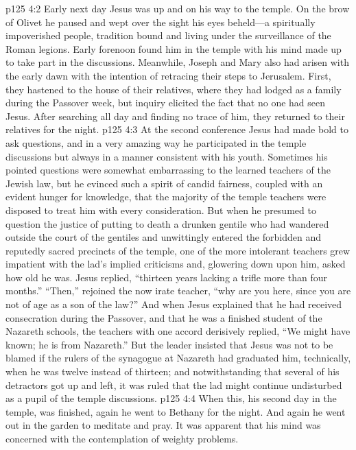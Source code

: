 \vs p125 4:2 Early next day Jesus was up and on his way to the temple. On the brow of Olivet he paused and wept over the sight his eyes beheld---a spiritually impoverished people, tradition bound and living under the surveillance of the Roman legions. Early forenoon found him in the temple with his mind made up to take part in the discussions. Meanwhile, Joseph and Mary also had arisen with the early dawn with the intention of retracing their steps to Jerusalem. First, they hastened to the house of their relatives, where they had lodged as a family during the Passover week, but inquiry elicited the fact that no one had seen Jesus. After searching all day and finding no trace of him, they returned to their relatives for the night.
\vs p125 4:3 At the second conference Jesus had made bold to ask questions, and in a very amazing way he participated in the temple discussions but always in a manner consistent with his youth. Sometimes his pointed questions were somewhat embarrassing to the learned teachers of the Jewish law, but he evinced such a spirit of candid fairness, coupled with an evident hunger for knowledge, that the majority of the temple teachers were disposed to treat him with every consideration. But when he presumed to question the justice of putting to death a drunken gentile who had wandered outside the court of the gentiles and unwittingly entered the forbidden and reputedly sacred precincts of the temple, one of the more intolerant teachers grew impatient with the lad’s implied criticisms and, glowering down upon him, asked how old he was. Jesus replied, \textcolor{ubdarkred}{“thirteen years lacking a trifle more than four months.”} “Then,” rejoined the now irate teacher, “why are you here, since you are not of age as a son of the law?” And when Jesus explained that he had received consecration during the Passover, and that he was a finished student of the Nazareth schools, the teachers with one accord derisively replied, “We might have known; he is from Nazareth.” But the leader insisted that Jesus was not to be blamed if the rulers of the synagogue at Nazareth had graduated him, technically, when he was twelve instead of thirteen; and notwithstanding that several of his detractors got up and left, it was ruled that the lad might continue undisturbed as a pupil of the temple discussions.\plusone
\vs p125 4:4 When this, his second day in the temple, was finished, again he went to Bethany for the night. And again he went out in the garden to meditate and pray. It was apparent that his mind was concerned with the contemplation of weighty problems.
